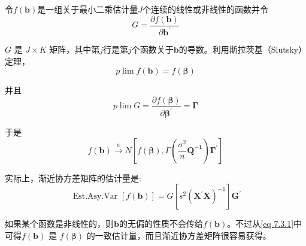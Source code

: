  令$ f(\boldsymbol{b}) $是一组关于最小二乘估计量$ J $个连续的线性或非线性的函数并令
 $$ G=\frac{\partial f(\boldsymbol{b})}{\partial \boldsymbol{b^{\prime}}} $$

 $ G $ 是 $J \times K$ 矩阵，其中第$ j $行是第$ j $个函数关于$ \boldsymbol{b} $的导数。利用斯拉茨基（Slutsky）定理，
$$ p \lim f(\boldsymbol{b})=f(\boldsymbol{\beta}) $$

并且
$$ p \lim G=\frac{\partial f(\boldsymbol{\beta})}{\partial \boldsymbol{\beta^{\prime}}} = \boldsymbol{\Gamma} $$

于是
\begin{equation}
    f(\boldsymbol{b}) \stackrel{a}{\longrightarrow} N\left[f(\boldsymbol{\beta}), \Gamma 
    \left(\frac{\sigma^{2}}{n} \boldsymbol{Q^{-1}} \right) \boldsymbol{\Gamma^{\prime}} \right]
    \label{eq 7.3.1}
\end{equation}

实际上，渐近协方差矩阵的估计量是:
$$ \text { Est.Asy.Var }[f(\boldsymbol{b})]=
    G\left[s^{2}\left( \boldsymbol{X^{\prime} X} \right)^{-1}\right] \boldsymbol{G^{\prime}} $$

如果某个函数是非线性的，则$ \boldsymbol{b} $的无偏的性质不会传给$ f(\boldsymbol{b}) $。不过从\ref{eq 7.3.1}中可得$ f(\boldsymbol{b}) $
是 $ f(\boldsymbol{\beta}) $ 的一致估计量，而且渐近协方差矩阵很容易获得。
\begin{myexample}[P324（小 Green）]
\end{myexample}

